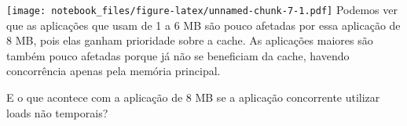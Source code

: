 \documentclass[
]{article}
\newenvironment{Shaded}{\begin{snugshade}}{\end{snugshade}}
\newcommand{\DataTypeTok}[1]{\textcolor[rgb]{0.13,0.29,0.53}{#1}}
\newcommand{\DecValTok}[1]{\textcolor[rgb]{0.00,0.00,0.81}{#1}}
\newcommand{\FloatTok}[1]{\textcolor[rgb]{0.00,0.00,0.81}{#1}}
\newcommand{\KeywordTok}[1]{\textcolor[rgb]{0.13,0.29,0.53}{\textbf{#1}}}
\newcommand{\NormalTok}[1]{#1}
\newcommand{\OperatorTok}[1]{\textcolor[rgb]{0.81,0.36,0.00}{\textbf{#1}}}
\newcommand{\StringTok}[1]{\textcolor[rgb]{0.31,0.60,0.02}{#1}}
\begin{document}
\begin{Shaded}
\end{Shaded}

\texttt{[image: notebook\_files/figure-latex/unnamed-chunk-7-1.pdf]}
Podemos ver que as aplicações que usam de 1 a 6 MB são pouco afetadas
por essa aplicação de 8 MB, pois elas ganham prioridade sobre a cache.
As aplicações maiores são também pouco afetadas porque já não se
beneficiam da cache, havendo concorrência apenas pela memória principal.

E o que acontece com a aplicação de 8 MB se a aplicação concorrente
utilizar loads não temporais?

\begin{Shaded}
\end{Shaded}
\end{document}

